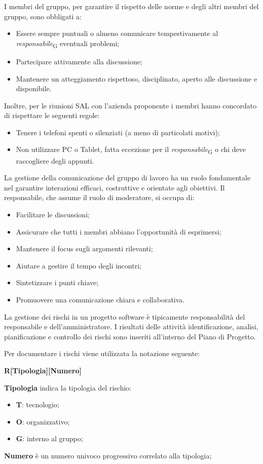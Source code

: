 I membri del gruppo, per garantire il rispetto delle norme e degli altri membri del gruppo, sono obbligati a:
\begin{itemize}
    \item Essere sempre puntuali o almeno comunicare tempestivamente al \textit{responsabile}\textsubscript{G} eventuali problemi;
    \item Partecipare attivamente alla discussione;
    \item Mantenere un atteggiamento rispettoso, disciplinato, aperto alle discussione e disponibile.
\end{itemize}
Inoltre, per le riunioni SAL con l'azienda proponente i membri hanno concordato di rispettare le seguenti regole:
\begin{itemize}
    \item Tenere i telefoni spenti o silenziati (a meno di particolati motivi);
    \item Non utilizzare PC o Tablet, fatta eccezione per il \textit{responsabile}\textsubscript{G} o chi deve raccogliere degli appunti.
\end{itemize}

La gestione della comunicazione del gruppo di lavoro ha un ruolo fondamentale nel garantire interazioni efficaci, costruttive e orientate agli obiettivi. Il responsabile, che assume il ruolo di moderatore, si occupa di:
\begin{itemize}
    \item Facilitare le discussioni;
    \item Assicurare che tutti i membri abbiano l’opportunità di esprimersi;
    \item Mantenere il focus sugli argomenti rilevanti;
    \item Aiutare a gestire il tempo degli incontri;
    \item Sintetizzare i punti chiave;
    \item Promuovere una comunicazione chiara e collaborativa.
\end{itemize}

La gestione dei rischi in un progetto software è tipicamente responsabilità del responsabile e dell'amministratore. I risultati delle attività identificazione, analisi, pianificazione e controllo dei rischi sono inseriti all'interno del Piano di Progetto.

Per documentare i rischi viene utilizzata la notazione seguente:
\begin{center}
    \textbf{R[Tipologia][Numero]}
\end{center}
\textbf{Tipologia} indica la tipologia del rischio:
\begin{itemize}
    \item \textbf{T}: tecnologio;
    \item \textbf{O}: organizzativo;
    \item \textbf{G}: interno al gruppo;
\end{itemize}
\textbf{Numero} è un numero univoco progressivo correlato alla tipologia;

